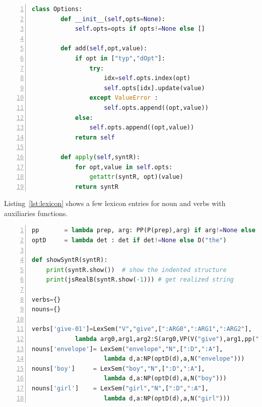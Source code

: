 \documentclass[12pt]{article}
\begin{document}
\begin{lstlisting}[language=Python,basicstyle=\ttfamily\footnotesize,
                   numbers=left,numbersep=5pt,numberstyle=\tiny,
                   aboveskip=\medskipamount,float=ht,
                   caption={Options representation.},
                   label=lst:Options]
    class Options:
        def __init__(self,opts=None):
            self.opts=opts if opts!=None else []
        
        def add(self,opt,value):
            if opt in ["typ","dOpt"]:
                try:
                    idx=self.opts.index(opt)
                    self.opts[idx].update(value)
                except ValueError :
                    self.opts.append((opt,value))
            else:         
                self.opts.append((opt,value))
            return self
        
        def apply(self,syntR):
            for opt,value in self.opts:
                getattr(syntR, opt)(value)
            return syntR
\end{lstlisting}

Listing~\ref{lst:lexicon} shows a few lexicon entries for noun and verbs with auxiliaries functions. 
\begin{lstlisting}[language=Python,basicstyle=\ttfamily\footnotesize,
                   numbers=left,numbersep=5pt,numberstyle=\tiny,
                   aboveskip=\medskipamount,float=ht,
                   caption={Lexicon representation.},
                   label=lst:lexicon]
pp       = lambda prep, arg: PP(P(prep),arg) if arg!=None else None
optD     = lambda det : det if det!=None else D("the")

def showSyntR(syntR):
    print(syntR.show())  # show the indented structure
    print(jsRealB(syntR.show(-1))) # get realized string

verbs={}
nouns={}

verbs['give-01']=LexSem("V","give",[":ARG0",":ARG1",":ARG2"],
            lambda arg0,arg1,arg2:S(arg0,VP(V("give"),arg1,pp("to",arg2))))    
nouns['envelope']= LexSem("envelope","N",[":D",":A"],
                    lambda d,a:NP(optD(d),a,N("envelope")))
nouns['boy']     = LexSem("boy","N",[":D",":A"],
                    lambda d,a:NP(optD(d),a,N("boy")))
nouns['girl']    = LexSem("girl","N",[":D",":A"],
                    lambda d,a:NP(optD(d),a,N("girl")))

\end{lstlisting}
\end{document}
